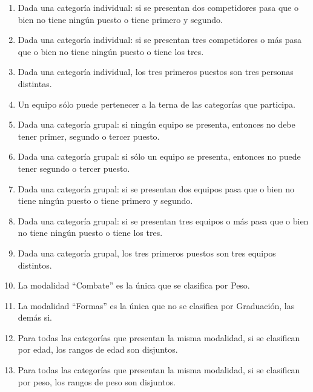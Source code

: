 \begin{enumerate}
\item Dada una categor\'ia individual: si se presentan dos competidores pasa que o bien no tiene ning\'un puesto o tiene primero y segundo.
\item Dada una categor\'ia individual: si se presentan tres competidores o m\'as pasa que o bien no tiene ning\'un puesto o tiene los tres.
\item Dada una categor\'ia individual, los tres primeros puestos son tres personas distintas.
\item Un equipo s\'olo puede pertenecer a la terna de las categor\'ias que participa.
\item Dada una categor\'ia grupal: si ning\'un equipo se presenta, entonces no debe tener primer, segundo o tercer puesto.
\item Dada una categor\'ia grupal: si s\'olo un equipo se presenta, entonces no puede tener segundo o tercer puesto.
\item Dada una categor\'ia grupal: si se presentan dos equipos pasa que o bien no tiene ning\'un puesto o tiene primero y segundo.
\item Dada una categor\'ia grupal: si se presentan tres equipos o m\'as pasa que o bien no tiene ning\'un puesto o tiene los tres.
\item Dada una categor\'ia grupal, los tres primeros puestos son tres equipos distintos.
\item La modalidad ``Combate'' es la \'unica que se clasifica por Peso.
\item La modalidad ``Formas'' es la \'unica que no se clasifica por Graduaci\'on, las dem\'as si.
\item Para todas las categor\'ias que presentan la misma modalidad, si se clasifican por edad, los rangos de edad son disjuntos.
\item Para todas las categor\'ias que presentan la misma modalidad, si se clasifican por peso, los rangos de peso son disjuntos.
\end{enumerate}
